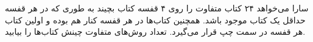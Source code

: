 \p
سارا می‌خواهد ۲۴ کتاب متفاوت را روی ۴ قفسه کتاب بچیند به طوری که در هر قفسه حداقل یک کتاب موجود باشد. همچنین کتاب‌ها در هر قفسه کنار هم بوده و اولین کتاب هر قفسه در سمت چپ قرار می‌گیرد. تعداد روش‌های متفاوت چینش کتاب‌ها را بیابید.
